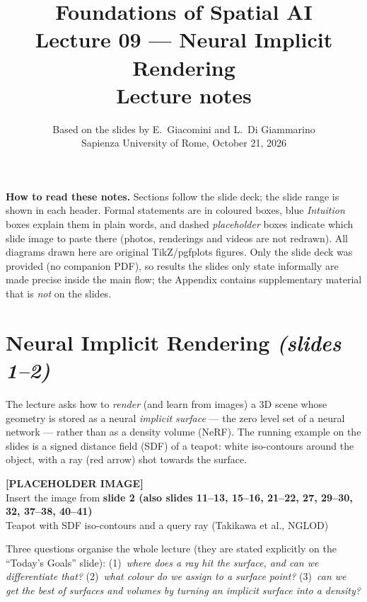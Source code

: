\documentclass[11pt,a4paper]{article}
\title{\textbf{Foundations of Spatial AI}\\[2pt] Lecture 09 --- Neural Implicit Rendering\\[4pt]
\large Lecture notes}
\author{Based on the slides by E.~Giacomini and L.~Di Giammarino\\ Sapienza University of Rome, October 21, 2026}
\date{}
\newcommand{\slideimg}[2]{%
  \begin{center}
  \begin{tcolorbox}[enhanced,colback=gray!8,colframe=gray!8,width=0.92\linewidth,
    halign=center,valign=center,height=3.4cm,
    overlay={\draw[dashed,gray!70,thick] (frame.south west) rectangle (frame.north east);}]
  \textbf{[PLACEHOLDER IMAGE]}\\ Insert the image from \textbf{#1}\\ {\small #2}
  \end{tcolorbox}
  \end{center}}
\begin{document}
\maketitle
\begin{center}
\begin{minipage}{0.9\linewidth}\small
\textbf{How to read these notes.} Sections follow the slide deck; the slide range is shown in each header.
Formal statements are in coloured boxes, blue \emph{Intuition} boxes explain them in plain words, and dashed
\emph{placeholder} boxes indicate which slide image to paste there (photos, renderings and videos are not redrawn).
All diagrams drawn here are original TikZ/pgfplots figures. Only the slide deck was provided (no companion PDF),
so results the slides only state informally are made precise inside the main flow; the Appendix contains
supplementary material that is \emph{not} on the slides.
\end{minipage}
\end{center}
\tableofcontents
\newpage

\section{Neural Implicit Rendering \emph{(slides 1--2)}}
The lecture asks how to \emph{render} (and learn from images) a 3D scene whose geometry is stored as a neural
\emph{implicit surface} --- the zero level set of a neural network --- rather than as a density volume (NeRF).
The running example on the slides is a signed distance field (SDF) of a teapot: white iso-contours around the
object, with a ray (red arrow) shot towards the surface.

\slideimg{slide 2 (also slides 11--13, 15--16, 21--22, 27, 29--30, 32, 37--38, 40--41)}{Teapot with SDF iso-contours and a query ray (Takikawa et al., NGLOD)}

\begin{intuition}
Three questions organise the whole lecture (they are stated explicitly on the ``Today's Goals'' slide):
(1)~\emph{where does a ray hit the surface, and can we differentiate that?}
(2)~\emph{what colour do we assign to a surface point?}
(3)~\emph{can we get the best of surfaces and volumes by turning an implicit surface into a density?}
\end{intuition}

\end{document}
